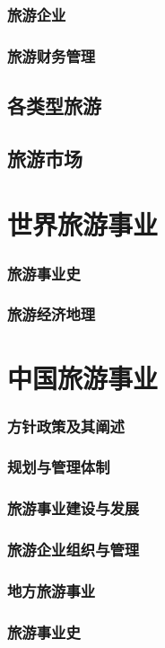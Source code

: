 \documentclass[UTF8]{../../RepresentationUniverse}
\begin{document}
        \subsubsection{旅游企业}
        \subsubsection{旅游财务管理}
    \subsection{各类型旅游}
    \subsection{旅游市场}

\section{世界旅游事业}
    \subsubsection{旅游事业史}
    \subsubsection{旅游经济地理}

\section{中国旅游事业}
    \subsubsection{方针政策及其阐述}
    \subsubsection{规划与管理体制}
    \subsubsection{旅游事业建设与发展}
    \subsubsection{旅游企业组织与管理}
    \subsubsection{地方旅游事业}
    \subsubsection{旅游事业史}
\end{document}
